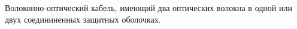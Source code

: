 Волоконно-оптический кабель, имеющий два оптических волокна
в одной или двух соедининенных защитных оболочках.